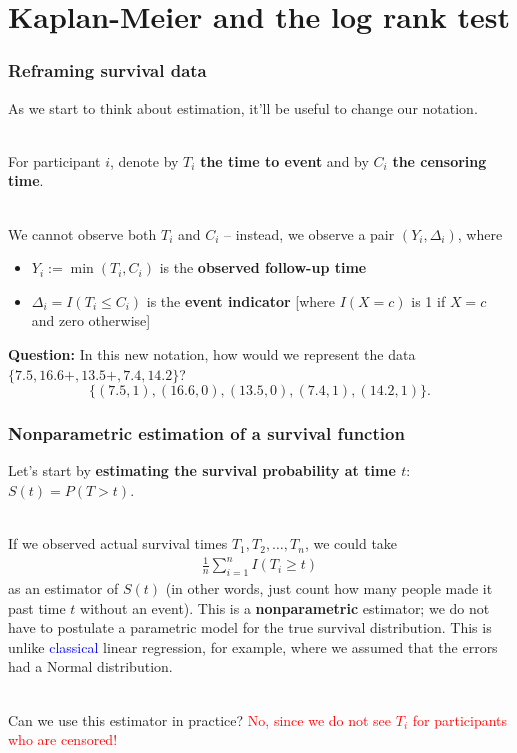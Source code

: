 \documentclass[10pt,t]{beamer}
\begin{document}
\section{Kaplan-Meier and the log rank test}

\begin{frame}
\frametitle{Reframing survival data}

As we start to think about estimation, it'll be useful to change our notation.
\\ ~\ 

For participant $i$, denote by $T_i$ \textbf{the time to event} and by $C_i$ \textbf{the censoring time}. \pause 
\\ ~\ 

We cannot observe both $T_i$ and $C_i$ -- instead, we observe a pair $(Y_i, \Delta_i)$, where \pause 
\begin{itemize}
\item $Y_i := \min(T_i, C_i)$ is the \textbf{observed follow-up time} \pause
\item $\Delta_i = I(T_i \leq C_i)$ is the \textbf{event indicator} [where $I(X = c)$ is 1 if $X = c$ and zero otherwise] \pause
\end{itemize}

\textbf{Question:} In this new notation, how would we represent the data $\{7.5, 16.6+, 13.5+, 7.4, 14.2\}$?\pause 
\[\{(7.5, 1), (16.6, 0), (13.5, 0), (7.4, 1), (14.2, 1)\}.\]
\end{frame}

\begin{frame}
\frametitle{Nonparametric estimation of a survival function}
Let's start by \textbf{estimating the survival probability at time $t$}: $S(t) = P(T > t)$.
\\ ~\ 

If we observed actual survival times $T_1, T_2, \dots, T_n$, we could take
\begin{align*}
\frac{1}{n}\sum_{i=1}^n I(T_i \geq t)
\end{align*}
as an estimator of $S(t)$ (in other words, just count how many people made it past time $t$ without an event). This is a \textbf{nonparametric} estimator; we do not have to postulate a parametric model for the true survival distribution. This is unlike \textcolor{blue}{classical} linear regression, for example, where we assumed that the errors had a Normal distribution. 
\\ ~\ 

Can we use this estimator in practice? \pause \textcolor{red}{No, since we do not see $T_i$ for participants who are censored!}
\end{frame}
\end{document}
